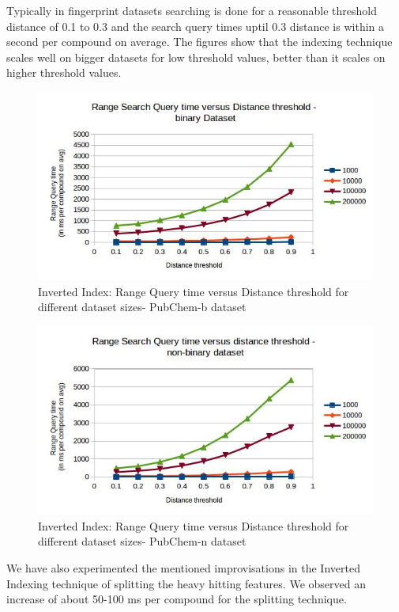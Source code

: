 Typically in fingerprint datasets searching is done for a reasonable threshold distance of 0.1 to 0.3 and the search query times uptil 0.3 distance is within a second per compound on average. The figures show that the indexing technique scales well on bigger datasets for low threshold values, better than it scales on higher threshold values.


\begin{figure}[ht]	
\centering
\includegraphics[width=1 \columnwidth]{img/imageI2.jpg}
\caption{Inverted Index: Range Query time versus Distance threshold for different dataset sizes- PubChem-b dataset}
\label{fig:5I2}
\end{figure}

\begin{figure}[ht!]	
\centering
\includegraphics[width=1 \columnwidth]{img/imageI3.jpg}
\caption{Inverted Index: Range Query time versus Distance threshold for different dataset sizes- PubChem-n dataset}
\label{fig:5I3}
\end{figure}


We have also experimented the mentioned improvisations in the Inverted Indexing technique of splitting the heavy hitting features. We observed an increase of about 50-100 ms per compound for the splitting technique.



